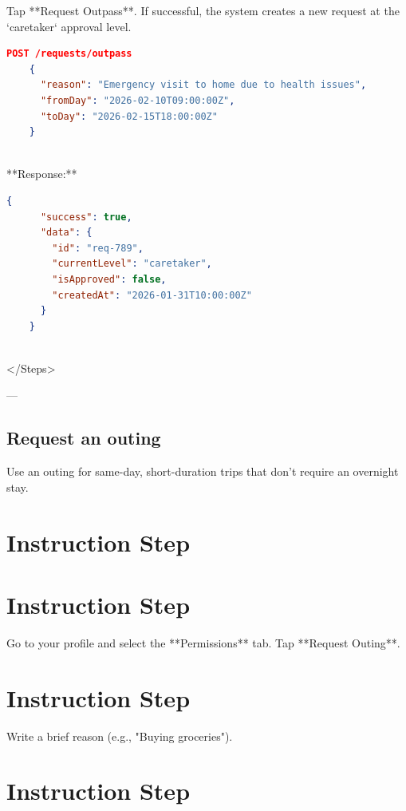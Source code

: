     Tap **Request Outpass**. If successful, the system creates a new request at the `caretaker` approval level.

    \begin{lstlisting}[language=json]
    POST /requests/outpass
    {
      "reason": "Emergency visit to home due to health issues",
      "fromDay": "2026-02-10T09:00:00Z",
      "toDay": "2026-02-15T18:00:00Z"
    }
    
\end{lstlisting}

    **Response:**

    \begin{lstlisting}[language=json]
    {
      "success": true,
      "data": {
        "id": "req-789",
        "currentLevel": "caretaker",
        "isApproved": false,
        "createdAt": "2026-01-31T10:00:00Z"
      }
    }
    
\end{lstlisting}

  
</Steps>

---

\subsection{Request an outing}

Use an outing for same-day, short-duration trips that don't require an overnight stay.


\section{Instruction Step}

  
\section{Instruction Step}

    Go to your profile and select the **Permissions** tab. Tap **Request Outing**.
  
  
\section{Instruction Step}

    Write a brief reason (e.g., "Buying groceries").
  
  
\section{Instruction Step}

